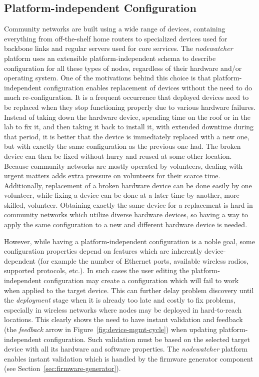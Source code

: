 \documentclass[5p,sort&compress]{elsarticle}
\newcommand{\nodewatcher}{\textit{nodewatcher}}
\begin{document}
\subsection{Platform-independent Configuration}

Community networks are built using a wide range of devices, containing everything from off-the-shelf home routers to specialized devices used for backbone links and regular servers used for core services.
The \nodewatcher{} platform uses an extensible platform-independent schema to describe configuration for all these types of nodes, regardless of their hardware and/or operating system.
One of the motivations behind this choice is that platform-independent configuration enables replacement of devices without the need to do much re-configuration.
It is a frequent occurrence that deployed devices need to be replaced when they stop functioning properly due to various hardware failures.
Instead of taking down the hardware device, spending time on the roof or in the lab to fix it, and then taking it back to install it, with extended downtime during that period, it is better that the device is immediately replaced with a new one, but with exactly the same configuration as the previous one had.
The broken device can then be fixed without hurry and reused at some other location.
Because community networks are mostly operated by volunteers, dealing with urgent matters adds extra pressure on volunteers for their scarce time.
Additionally, replacement of a broken hardware device can be done easily by one volunteer, while fixing a device can be done at a later time by another, more skilled, volunteer.
Obtaining exactly the same device for a replacement is hard in community networks which utilize diverse hardware devices, so having a way to apply the same configuration to a new and different hardware device is needed.

However, while having a platform-independent configuration is a noble goal, some configuration properties depend on features which are inherently device-dependent (for example the number of Ethernet ports, available wireless radios, supported protocols, etc.).
In such cases the user editing the platform-independent configuration may create a configuration which will fail to work when applied to the target device.
This can further delay problem discovery until the \textit{deployment} stage when it is already too late and costly to fix problems, especially in wireless networks where nodes may be deployed in hard-to-reach locations.
This clearly shows the need to have instant validation and feedback (the \textit{feedback} arrow in Figure~\ref{fig:device-mgmt-cycle}) when updating platform-independent configuration.
Such validation must be based on the selected target device with all its hardware and software properties.
The \nodewatcher{} platform enables instant validation which is handled by the firmware generator component (see Section~\ref{sec:firmware-generator}).
\end{document}
